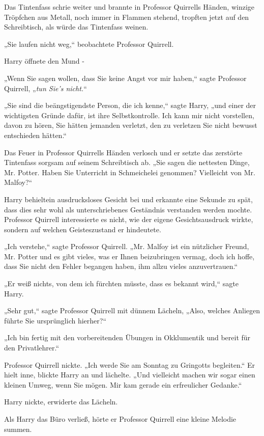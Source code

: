 {Das Tintenfass schrie weiter und brannte in Professor Quirrells Händen, winzige Tröpfchen aus Metall, noch immer in Flammen stehend, tropften jetzt auf den Schreibtisch, als würde das Tintenfass weinen.

„Sie laufen nicht weg,“ beobachtete Professor Quirrell.

Harry öffnete den Mund -

„Wenn Sie sagen wollen, dass Sie keine Angst vor mir haben,“ sagte Professor Quirrell, „\emph{tun Sie's nicht.}“

„Sie sind die beängstigendste Person, die ich kenne,“ sagte Harry, „und einer der wichtigsten Gründe dafür, ist ihre Selbstkontrolle. Ich kann mir nicht vorstellen, davon zu hören, Sie hätten jemanden verletzt, den zu verletzen Sie nicht bewusst entschieden hätten.“

Das Feuer in Professor Quirrells Händen verlosch und er setzte das zerstörte Tintenfass sorgsam auf seinem Schreibtisch ab. „Sie sagen die nettesten Dinge, Mr. Potter. Haben Sie Unterricht in Schmeichelei genommen? Vielleicht von Mr. Malfoy?“

Harry behieltein ausdrucksloses Gesicht bei und erkannte eine Sekunde zu spät, dass dies sehr wohl als unterschriebenes Geständnis verstanden werden mochte. Professor Quirrell interessierte es nicht, wie der eigene Gesichtsausdruck wirkte, sondern auf welchen Geisteszustand er hindeutete.

„Ich verstehe,“ sagte Professor Quirrell. „Mr. Malfoy ist ein nützlicher Freund, Mr. Potter und es gibt vieles, was er Ihnen beizubringen vermag, doch ich hoffe, dass Sie nicht den Fehler begangen haben, ihm allzu vieles anzuvertrauen.“

„Er weiß nichts, von dem ich fürchten müsste, dass es bekannt wird,“ sagte Harry.

„Sehr gut,“ sagte Professor Quirrell mit dünnem Lächeln, „Also, welches Anliegen führte Sie ursprünglich hierher?“

„Ich bin fertig mit den vorbereitenden Übungen in Okklumentik und bereit für den Privatlehrer.“

Professor Quirrell nickte. „Ich werde Sie am Sonntag zu Gringotts begleiten.“ Er hielt inne, blickte Harry an und lächelte. „Und vielleicht machen wir sogar einen kleinen Umweg, wenn Sie mögen. Mir kam gerade ein erfreulicher Gedanke.“

Harry nickte, erwiderte das Lächeln.

Als Harry das Büro verließ, hörte er Professor Quirrell eine kleine Melodie summen.

}
